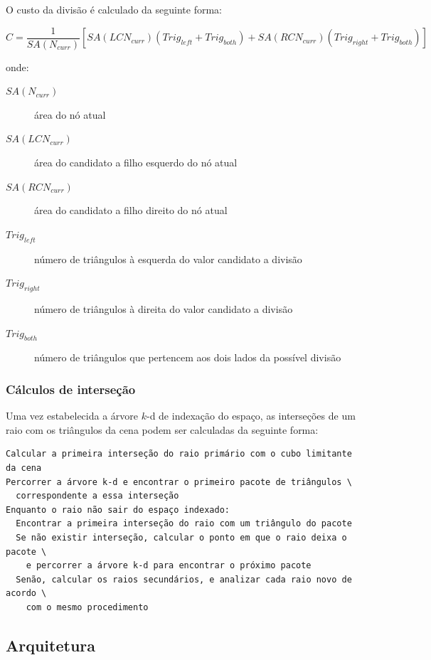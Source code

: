\documentclass[a4paper,12pt]{article}
\begin{document}
O custo da divisão é calculado da seguinte forma:

\begin{small}
\[
C = \frac{1}{SA(N_{curr})} [ SA(LCN_{curr})(Trig_{left} + Trig_{both})
  + SA(RCN_{curr})(Trig_{right} + Trig_{both}) ]
\]
\end{small}

onde:

\begin{description}
\item[$SA(N_{curr})$] área do nó atual
\item[$SA(LCN_{curr})$] área do candidato a filho esquerdo do nó atual
\item[$SA(RCN_{curr})$] área do candidato a filho direito do nó atual
\item[$Trig_{left}$] número de triângulos à esquerda do valor candidato a
  divisão
\item[$Trig_{right}$] número de triângulos à direita do valor candidato a
  divisão
\item[$Trig_{both}$] número de triângulos que pertencem aos dois lados
  da possível divisão
\end{description}

\subsubsection{Cálculos de interseção}
Uma vez estabelecida a árvore $k$-d de indexação do espaço, as interseções
de um raio com os triângulos da cena podem ser calculadas da seguinte forma:

\begin{footnotesize}
\begin{verbatim}
Calcular a primeira interseção do raio primário com o cubo limitante da cena
Percorrer a árvore k-d e encontrar o primeiro pacote de triângulos \
  correspondente a essa interseção
Enquanto o raio não sair do espaço indexado:
  Encontrar a primeira interseção do raio com um triângulo do pacote
  Se não existir interseção, calcular o ponto em que o raio deixa o pacote \
    e percorrer a árvore k-d para encontrar o próximo pacote
  Senão, calcular os raios secundários, e analizar cada raio novo de acordo \
    com o mesmo procedimento
\end{verbatim}
\end{footnotesize}

\subsection{Arquitetura}
\end{document}
